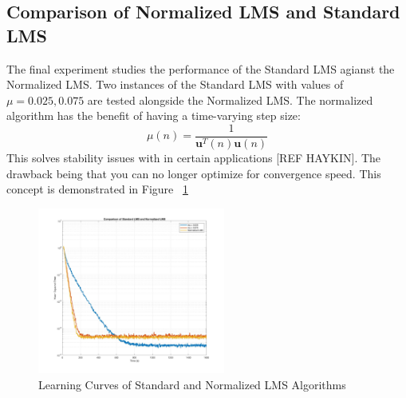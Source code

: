 \documentclass[journal]{IEEEtran}
\begin{document}
\subsection{Comparison of Normalized LMS and Standard LMS}
The final experiment studies the performance of the Standard LMS agianst the Normalized LMS. Two instances of the
Standard LMS with values of $\mu = 0.025, 0.075$ are tested alongside the Normalized LMS. The normalized algorithm has the
benefit of having a time-varying step size:
$$\mu(n) = \dfrac{1}{\boldsymbol{u}^T(n)\boldsymbol{u}(n)}$$
This solves stability issues with in certain applications [REF HAYKIN]. The drawback being that you can no longer
optimize for convergence speed. This concept is demonstrated in Figure ~\ref{fig:normalizedlms}
\begin{figure}[H]
  \centering
  \captionsetup{justification=centering}
  \includegraphics[width=0.55\textwidth, right] {Plots/Project1_Part5.jpg}
  \caption{Learning Curves of Standard and Normalized LMS Algorithms}
    \label{fig:normalizedlms}
\end{figure}

\end{document}
